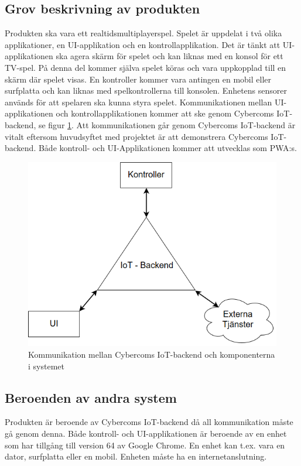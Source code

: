 \documentclass[10pt]{article}
\begin{document}
	\subsection{Grov beskrivning av produkten}
	Produkten ska vara ett realtidsmultiplayerspel. Spelet är uppdelat i två olika applikationer, en UI-applikation och en kontrollapplikation. Det är tänkt att UI-applikationen ska agera skärm för spelet och kan liknas med en konsol för ett TV-spel. På denna del kommer själva spelet köras och vara uppkopplad till en skärm där spelet visas. En kontroller kommer vara antingen en mobil eller surfplatta och kan liknas med spelkontrollerna till konsolen. Enhetens sensorer används för att spelaren ska kunna styra spelet. Kommunikationen mellan UI-applikationen och kontrollapplikationen kommer att ske genom Cybercoms IoT-backend, se figur \ref{fig:backend}. Att kommunikationen går genom Cybercoms IoT-backend är vitalt eftersom huvudsyftet med projektet är att demonstrera Cybercoms IoT-backend.  Både kontroll- och UI-Applikationen kommer att utvecklas som PWA:s. 
	
	\begin{figure}[h]
		\centering
		\includegraphics[scale=0.4]{backend}
		\caption{Kommunikation mellan Cybercoms IoT-backend och komponenterna i systemet}
		\label{fig:backend}
	\end{figure}
	
	
	\subsection{Beroenden av andra system}
	Produkten är beroende av Cybercoms IoT-backend då all kommunikation måste gå genom denna. Både kontroll- och UI-applikationen är beroende av en enhet som har tillgång till version 64 av Google Chrome. En enhet kan t.ex. vara en dator, surfplatta eller en mobil. Enheten måste ha en internetanslutning.
\end{document}
